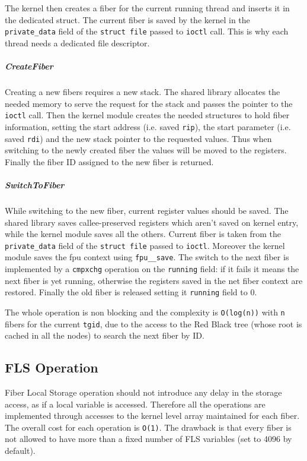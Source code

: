 \documentclass[11pt]{article}
\begin{document}
The kernel then creates a fiber for the current running thread and inserts it in the dedicated struct. The current fiber is saved by the kernel in the {\tt private\_data} field of the {\tt struct file} passed to {\tt ioctl} call. This is why each thread needs a dedicated file descriptor.

\subparagraph{CreateFiber}
Creating a new fibers requires a new stack. The shared library allocates the needed memory to serve the request for the stack and passes the pointer to the {\tt ioctl} call. Then the kernel module creates the needed structures to hold fiber information, setting the start address (i.e. saved {\tt rip}), the start parameter (i.e. saved {\tt rdi}) and the new stack pointer to the requested values. Thus when switching to the newly created fiber the values will be moved to the registers. Finally the fiber ID assigned to the new fiber is returned.

\subparagraph{SwitchToFiber}
While switching to the new fiber, current register values should be saved. The shared library saves callee-preserved registers which aren't saved on kernel entry, while the kernel module saves all the others. Current fiber is taken from the {\tt private\_data} field of the {\tt struct file} passed to {\tt ioctl}. Moreover the kernel module saves the fpu context using {\tt fpu\_\_save}. The switch to the next fiber is implemented by a {\tt cmpxchg} operation on the {\tt running} field: if it fails it means the next fiber is yet running, otherwise the registers saved in the net fiber context are restored. Finally the old fiber is released setting it {\tt running} field to 0.

The whole operation is non blocking and the complexity is {\tt O(log(n))} with {\tt n} fibers for the current {\tt tgid}, due to the access to the Red Black tree (whose root is cached in all the nodes) to search the next fiber by ID.

\subsection{FLS Operation}
Fiber Local Storage operation should not introduce any delay in the storage access, as if a local variable is accessed. Therefore all the operations are implemented through accesses to the kernel level array maintained for each fiber. The overall cost for each operation is {\tt O(1)}. The drawback is that every fiber is not allowed to have more than a fixed number of FLS variables (set to 4096 by default).
\end{document}
